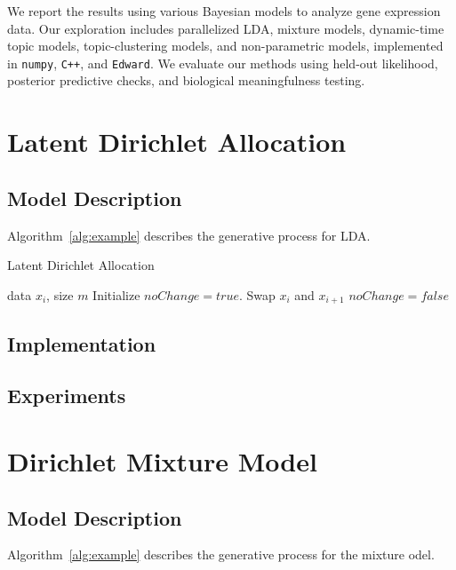 \documentclass{article}
\begin{document}
    We report the results using various Bayesian models to analyze gene expression data. Our exploration includes parallelized LDA, mixture models, dynamic-time topic models, topic-clustering models, and non-parametric models, implemented in \texttt{numpy}, \texttt{C++}, and \texttt{Edward}. We evaluate our methods using held-out likelihood, posterior predictive checks, and biological meaningfulness testing.



\section{Latent Dirichlet Allocation} 
\subsection{Model Description} 
    Algorithm~\ref{alg:example} describes the generative process for LDA.

    \begin{algorithm}[tb]
       \caption{Latent Dirichlet Allocation}
       \label{alg:example}
    \begin{algorithmic}
        data $x_i$, size $m$
       \REPEAT
       \STATE Initialize $noChange = true$.
       \STATE Swap $x_i$ and $x_{i+1}$
       \STATE $noChange = false$
       \ENDIF
       \ENDFOR
    \end{algorithmic}
    \end{algorithm}
\subsection{Implementation} 
\subsection{Experiments} 





\section{Dirichlet Mixture Model} 
\subsection{Model Description} 
    Algorithm~\ref{alg:example} describes the generative process for the mixture odel.
\end{document}

